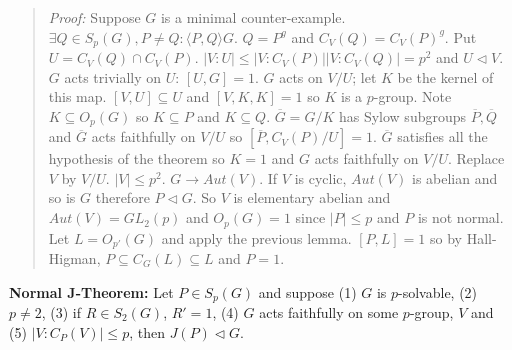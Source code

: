 \begin{quote}
\emph{Proof:} 
Suppose $G$ is a minimal counter-example. $\exists Q \in S_p(G), P \neq Q: \langle P, Q \rangle G$.
$Q= P^g$ and $C_V(Q) = C_V(P)^g$.  Put $U= C_V(Q) \cap C_V(P)$. $|V:U| \leq |V:C_V(P)| |V:C_V(Q)| = p^2$ and
$U \lhd V$.  $G$ acts trivially on $U$: $[U, G] = 1$.  $G$ acts on $V/U$; let $K$ be the kernel of this map.
$[V,U] \subseteq U$ and $[V, K, K] =1$ so $K$ is a $p$-group.  Note $K \subseteq O_p(G)$ so 
$K \subseteq P$ and $K \subseteq Q$. ${\overline G} = G/K$ has Sylow subgroups ${\overline P}, {\overline Q}$
and ${\overline G}$ acts faithfully on $V/U$ so $[{\overline P}, C_V(P)/U] = 1$.  ${\overline G}$ satisfies
all the hypothesis of the theorem so $K=1$ and $G$ acts faithfully on $V/U$.
Replace $V$ by $V/U$. $|V| \leq p^2$. $G \rightarrow Aut(V)$.  If $V$ is cyclic, $Aut(V)$ is abelian and
so is $G$ therefore $P \lhd G$.  So $V$ is elementary abelian and $Aut(V) = GL_2(p)$ and $O_p(G) = 1$ since
$|P| \leq p$ and $P$ is not normal.  Let $L = O_{p'}(G)$ and apply the previous lemma.  $[P, L]=1$ so by
Hall-Higman, $P \subseteq C_G(L) \subseteq L$ and $P=1$.
\end{quote}
{\bf Normal J-Theorem:} Let $P \in S_p(G)$ and suppose (1) $G$ is $p$-solvable, (2) $p \ne 2$, (3) if
$R \in S_2(G)$, $R' = 1$, (4) $G$ acts faithfully on some $p$-group, $V$ and (5) $|V:C_P(V)| \leq p$,
then $J(P) \lhd G$.
